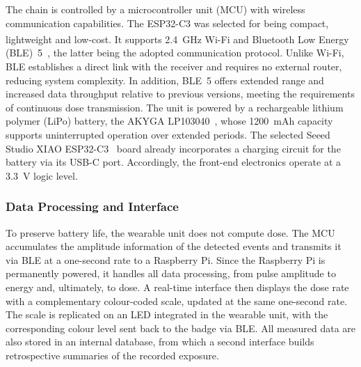 The chain is controlled by a microcontroller unit (MCU) with wireless communication capabilities. The ESP32-C3 was selected for being compact, lightweight and low-cost. It supports 2.4~GHz Wi-Fi and Bluetooth\textsuperscript{\textregistered} Low Energy (BLE)~5~\cite{134}, the latter being the adopted communication protocol. Unlike Wi-Fi, BLE establishes a direct link with the receiver and requires no external router, reducing system complexity. In addition, BLE~5 offers extended range and increased data throughput relative to previous versions, meeting the requirements of continuous dose transmission. The unit is powered by a rechargeable lithium polymer (LiPo) battery, the AKYGA LP103040~\cite{135}, whose 1200~mAh capacity supports uninterrupted operation over extended periods. The selected Seeed Studio XIAO ESP32-C3~\cite{133} board already incorporates a charging circuit for the battery via its USB-C port. Accordingly, the front-end electronics operate at a 3.3~V logic level.

\subsubsection{Data Processing and Interface}
To preserve battery life, the wearable unit does not compute dose. The MCU accumulates the amplitude information of the detected events and transmits it via BLE at a one-second rate to a Raspberry Pi. Since the Raspberry Pi is permanently powered, it handles all data processing, from pulse amplitude to energy and, ultimately, to dose. A real-time interface then displays the dose rate with a complementary colour-coded scale, updated at the same one-second rate. The scale is replicated on an LED integrated in the wearable unit, with the corresponding colour level sent back to the badge via BLE. All measured data are also stored in an internal database, from which a second interface builds retrospective summaries of the recorded exposure.
